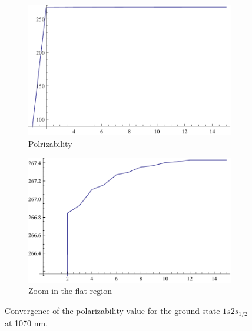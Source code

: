 \begin{figure}[h]
\centering
\begin{subfigure}[b]{0.4\textwidth}
                \includegraphics[width=\textwidth]{alphascalarconvground1}
                \caption{Polrizability \alpha}
\end{subfigure}
\begin{subfigure}[b]{0.4\textwidth}
               \includegraphics[width=\textwidth]{alphascalarconvground2}
                \caption{Zoom in the flat region}
\end{subfigure}


\caption{Convergence of the polarizability value for the ground state $1s2s_{1/2}$ at 1070 nm.}
\label{alphaconv2}

\end{figure}

